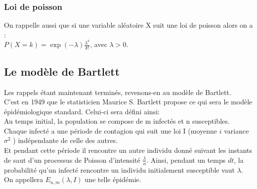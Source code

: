 \subsubsection{Loi de poisson}
On rappelle aussi que si une variable aléatoire X suit une loi de poisson alors on a :\\
$P(X=k) = \exp(-\lambda)\frac{\lambda^k}{k!}$, avec $\lambda>0$.

    	 
\subsection{Le modèle de Bartlett}
Les rappels étant maintenant terminés, revenons-en au modèle de Bartlett.\\
C’est en 1949 que le statisticien Maurice S. Bartlett propose ce qui sera le modèle épidémiologique standard. Celui-ci sera défini ainsi:\\
Au temps initial, la population se compose de m infectés et n susceptibles. Chaque infecté a une période de contagion qui suit une loi I (moyenne $i$ variance $\sigma^2$ ) indépendante de celle des autres.\\
Et pendant cette période il rencontre un autre individu donné suivant les instants de saut d’un processus de Poisson d’intensité $\frac{\lambda}{n}$. Ainsi, pendant un temps $dt$, la probabilité qu’un infecté rencontre un individu initialement susceptible vaut $\lambda$. \\
On appellera $E_{n,m}(\lambda, I)$ une telle épidémie.



